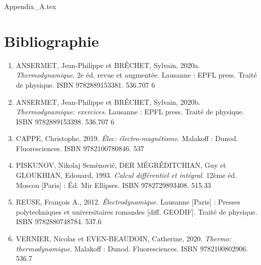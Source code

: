\documentclass[11pt,fleqn]{book} %
\begin{document}
{Appendix_A.tex}


\chapter*{Bibliographie}



\begin{enumerate}[label=(\arabic*)]

\item ANSERMET, Jean-Philippe et BRÉCHET, Sylvain, 2020a. \textit{Thermodynamique}. 2e éd. revue et augmentée. Lausanne : EPFL press. Traité de physique. ISBN 9782889153381. 536.707 6

\item ANSERMET, Jean-Philippe et BRÉCHET, Sylvain, 2020b. \textit{Thermodynamique: exercices}. Lausanne : EPFL press. Traité de physique. ISBN 9782889153398. 536.707 6

\item CAPPE, Christophe, 2019. \textit{Élec: électro-magnétisme}. Malakoff : Dunod. Fluoresciences. ISBN 9782100780846. 537

\item PISKUNOV, Nikolaj Semènovič, DER MÉGRÉDITCHIAN, Guy et GLOUKHIAN, Edouard, 1993. \textit{Calcul différentiel et intégral}. 12ème éd. Moscou [Paris] : Éd. Mir Ellipses. ISBN 9782729893408. 515.33

\item REUSE, François A., 2012. \textit{Électrodynamique}. Lausanne [Paris] : Presses polytechniques et universitaires romandes [diff. GEODIF]. Traité de physique. ISBN 9782880748784. 537.6

\item VERNIER, Nicolas et EVEN-BEAUDOIN, Catherine, 2020. \textit{Thermo: thermodynamique}. Malakoff : Dunod. Fluoresciences. ISBN 9782100802906. 536.7

\end{enumerate}

\end{document}
